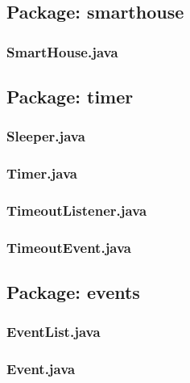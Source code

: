 
\subsection{Package: smarthouse}
\subsubsection{SmartHouse.java}


\subsection{Package: timer}
\subsubsection{Sleeper.java}

\subsubsection{Timer.java}

\subsubsection{TimeoutListener.java}

\subsubsection{TimeoutEvent.java}


\subsection{Package: events}
\subsubsection{EventList.java}

\subsubsection{Event.java}

